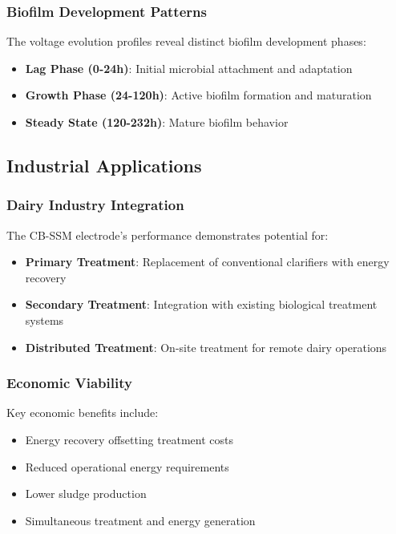 \documentclass[12pt,a4paper]{article}
\begin{document}
\subsubsection{Biofilm Development Patterns}

The voltage evolution profiles reveal distinct biofilm development phases:

\begin{itemize}
    \item \textbf{Lag Phase (0-24h)}: Initial microbial attachment and adaptation
    \item \textbf{Growth Phase (24-120h)}: Active biofilm formation and maturation
    \item \textbf{Steady State (120-232h)}: Mature biofilm behavior
\end{itemize}

\subsection{Industrial Applications}

\subsubsection{Dairy Industry Integration}

The CB-SSM electrode's performance demonstrates potential for:

\begin{itemize}
    \item \textbf{Primary Treatment}: Replacement of conventional clarifiers with energy recovery
    \item \textbf{Secondary Treatment}: Integration with existing biological treatment systems
    \item \textbf{Distributed Treatment}: On-site treatment for remote dairy operations
\end{itemize}

\subsubsection{Economic Viability}

Key economic benefits include:

\begin{itemize}
    \item Energy recovery offsetting treatment costs
    \item Reduced operational energy requirements
    \item Lower sludge production
    \item Simultaneous treatment and energy generation
\end{itemize}
\end{document}
